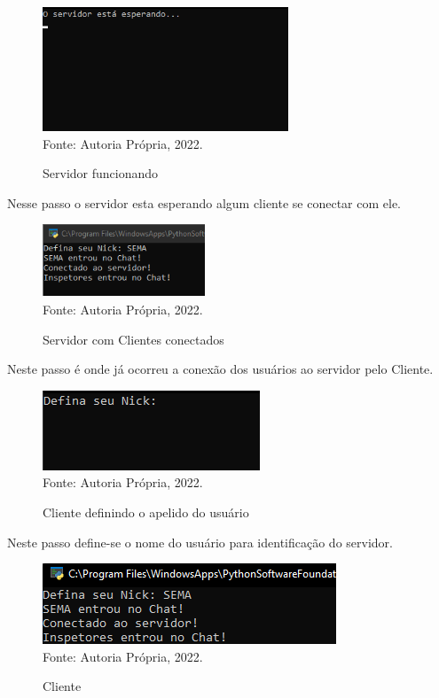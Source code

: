 \begin{figure}[htbp]
	\centering
	\caption{Servidor funcionando}
	\includegraphics[]{Printis/Servidorlistening.png}
	{\\Fonte: Autoria Própria, 2022.}
	\label{fig:criação_1}
\end{figure}

\par Nesse passo o servidor esta esperando algum cliente se conectar com ele.

\newpage\thispagestyle{empty}
\begin{figure}[htbp]
	\centering
	\caption{Servidor com Clientes conectados}
	\includegraphics[]{Printis/Sema.png}
	{\\Fonte: Autoria Própria, 2022.}
	\label{fig:criação_1}
\end{figure}

\par Neste passo é onde já ocorreu a conexão dos usuários ao servidor pelo Cliente.

\begin{figure}[htbp]
	\centering
	\caption{Cliente definindo o apelido do usuário}
	\includegraphics[]{PrintsServer/ClientNick.png}
	{\\Fonte: Autoria Própria, 2022.}
	\label{fig:criação_1}
\end{figure}

\par Neste passo define-se o nome do usuário para identificação do servidor.

\begin{figure}[htbp]
	\centering
	\caption{Cliente}
	\includegraphics[]{Printis/ClientCOn.png}
	{\\Fonte: Autoria Própria, 2022.}
	\label{fig:criação_1}
\end{figure}

